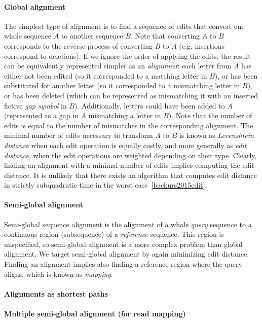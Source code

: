 \paragraph{Global alignment}
The simplest type of alignment is to find a sequence of edits that convert one
whole sequence $A$ to another sequence $B$. Note that converting $A$ to $B$
corresponds to the reverse process of converting $B$ to $A$ (e.g. insertions
correspond to deletions). If we ignore the order of applying the edits, the
result can be equivalently represented simpler as an \emph{alignmnet}: each
letter from $A$ has either not been edited (so it corresponded to a matching
letter in $B$), or has been substituted for another letter (so it corresponded
to a mismatching letter in $B$), or has been deleted (which can be represented
as mismatching it with an inserted fictive \emph{gap symbol} in $B$).
Additionally, letters could have been added to $A$ (represented as a gap in $A$
mismatching a letter in $B$). Note that the number of edits is equal to the
number of mismatches in the corresponding alignment. The minimal number of edits
necessary to transform $A$ to $B$ is known as \emph{Levenshtein distance} when
each edit operation is equally costly, and more generally as \emph{edit
distance}, when the edit operations are weighted depending on their type.
Clearly, finding an alignment with a minimal number of edits implies computing
the edit distance. It is unlikely that there exists an algorithm that computes
edit distance in strictly subquadratic time in the worst
case~\cref{backurs2015edit}.

\paragraph{Semi-global alignment}
Semi-global sequence alignment is the alignment of a whole \emph{query} sequence
to a continuous region (subsequence) of a \emph{reference} sequence. This region
is unspecified, so semi-global alignment is a more complex problem than global
alignment. We target semi-global alignment by again minimizing edit distance.
Finding an alignment implies also finding a reference region where the query
aligns, which is known as \emph{mapping}. 

\paragraph{Alignments as shortest paths}

\paragraph{Multiple semi-global alignment (for read mapping)}

